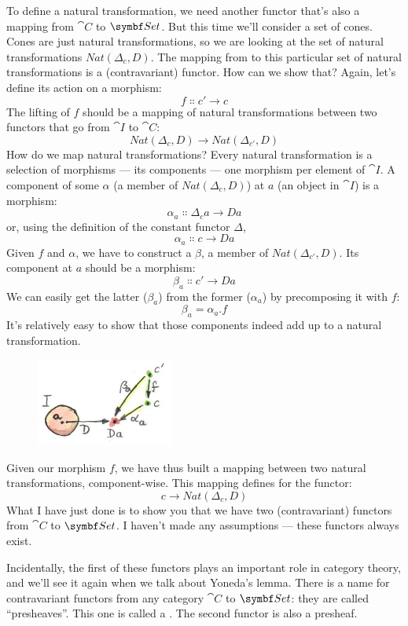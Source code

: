 \noindent
To define a natural transformation, we need another functor that's also
a mapping from $\cat{C}$ to $\Set$. But this time we'll consider a
set of cones. Cones are just natural transformations, so we are looking
at the set of natural transformations $Nat(\Delta_c, D)$. The mapping
from  to this particular set of natural transformations is a
(contravariant) functor. How can we show that? Again, let's define its
action on a morphism:
\[f \Colon c' \to c\]
The lifting of $f$ should be a mapping of natural transformations
between two functors that go from $\cat{I}$ to $\cat{C}$:
\[Nat(\Delta_c, D) \to Nat(\Delta_{c'}, D)\]
How do we map natural transformations? Every natural transformation is a
selection of morphisms --- its components --- one morphism per element
of $\cat{I}$. A component of some $\alpha$ (a member of $Nat(\Delta_c, D)$) at
$a$ (an object in $\cat{I}$) is a morphism:
\[\alpha_a \Colon \Delta_c a \to D a\]
or, using the definition of the constant functor $\Delta$,
\[\alpha_a \Colon c \to D a\]
Given $f$ and $\alpha$, we have to construct a $\beta$, a member of
$Nat(\Delta_{c'}, D)$. Its component at $a$ should be a
morphism:
\[\beta_a \Colon c' \to D a\]
We can easily get the latter ($\beta_a$) from the former ($\alpha_a$) by precomposing it with
$f$:
\[\beta_a = \alpha_a . f\]
It's relatively easy to show that those components indeed add up to a
natural transformation.

\begin{figure}[H]
  \centering
  \includegraphics[width=0.4\textwidth]{images/natmapping.jpg}
\end{figure}

\noindent
Given our morphism $f$, we have thus built a mapping between two
natural transformations, component-wise. This mapping defines
 for the functor:
\[c \to Nat(\Delta_c, D)\]
What I have just done is to show you that we have two (contravariant)
functors from $\cat{C}$ to $\Set$. I haven't made any assumptions
--- these functors always exist.

Incidentally, the first of these functors plays an important role in
category theory, and we'll see it again when we talk about Yoneda's
lemma. There is a name for contravariant functors from any category
$\cat{C}$ to $\Set$: they are called ``presheaves''. This one is
called a . The second functor is also a
presheaf.

